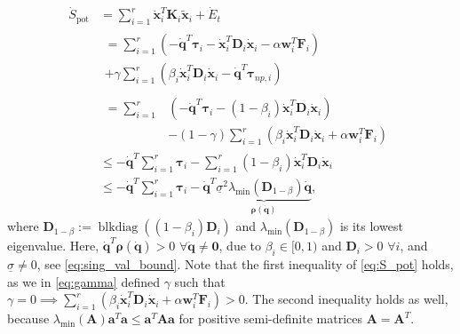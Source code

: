 \documentclass[../main.tex]{subfiles}
\begin{document}
\begin{equation} \label{eq:S_pot}
    \begin{aligned}
        \dot{S}_{\mathrm{pot}}  & = \sum_{i=1}^r \dot{\bm{x}}_{i}^T\bm{K}_{i}\tilde{\bm{x}}_{i} + \dot{E}_{t} \\
        &
        \begin{aligned}
            = \sum_{i=1}^r (-\dot{\bm{q}}^T\bm{\tau}_{i} - \dot{\bm{x}}_{i}^T\bm{D}_{i}\dot{\bm{x}}_{i} - \alpha\bm{w}_{i}^T\bm{F}_{i}) \\
            + \gamma\sum_{i=1}^r \left( \beta_{i} \dot{\bm{x}}_{i}^T\bm{D}_{i}\dot{\bm{x}}_{i} - \dot{\bm{q}}^T\bm{\tau}_{np,i} \right) 
        \end{aligned} 
          \\
        &
        \begin{aligned}
            = \sum_{i=1}^r & \left(-\dot{\bm{q}}^T\bm{\tau}_{i} - (1-\beta_i) \dot{\bm{x}}_{i}^T\bm{D}_{i}\dot{\bm{x}}_{i} \right)\\
            &- (1-\gamma) \sum_{i=1}^r\left(\beta_i \dot{\bm{x}}_{i}^T\bm{D}_{i}\dot{\bm{x}}_{i} + \alpha\bm{w}_{i}^T\bm{F}_{i}\right) 
        \end{aligned} \\
        & \leq -\dot{\bm{q}}^T\sum_{i=1}^r \bm{\tau}_{i} - \sum_{i=1}^r (1-\beta_i) \dot{\bm{x}}_{i}^T\bm{D}_{i}\dot{\bm{x}}_{i} \\
        & \leq -\dot{\bm{q}}^T\sum_{i=1}^r \bm{\tau}_{i} - \dot{\bm{q}}^T\underbrace{\underline{\sigma}^2 \lambda_\mathrm{min}(\bm{D}_{1-\beta}) \dot{\bm{q}}}_{\bm{\rho}(\dot{\bm{q}})},
    \end{aligned}
\end{equation}
where $\bm{D}_{1-\beta} := \operatorname{blkdiag}\left((1-\beta_i)\bm{D}_i\right)$ and $\lambda_\mathrm{min}(\bm{D}_{1-\beta})$ is its lowest eigenvalue. Here, $\dot{\bm{q}}^T\bm{\rho}(\dot{\bm{q}})>0$ $\forall \dot{\bm{q}} \neq \bm{0}$, due to  $\beta_i \in [0,1)$ and $\bm{D}_i>0$ $\forall i$, and $\underline{\sigma} \neq 0$, see \eqref{eq:sing_val_bound}.
Note that the first inequality of \eqref{eq:S_pot} holds, as we in \eqref{eq:gamma} defined $\gamma$ such that $\gamma=0 \implies \sum_{i=1}^r (\beta_i\dot{\bm{x}}_{i}^T\bm{D}_{i}\dot{\bm{x}}_{i} +\alpha\bm{w}_{i}^T\bm{F}_{i}) > 0$.
The second inequality holds as well, because $\lambda_\mathrm{min}(\bm{A})\bm{a}^T\bm{a} \leq \bm{a}^T\bm{Aa}$ for positive semi-definite matrices $\bm{A} = \bm{A}^T$.
\end{document}
